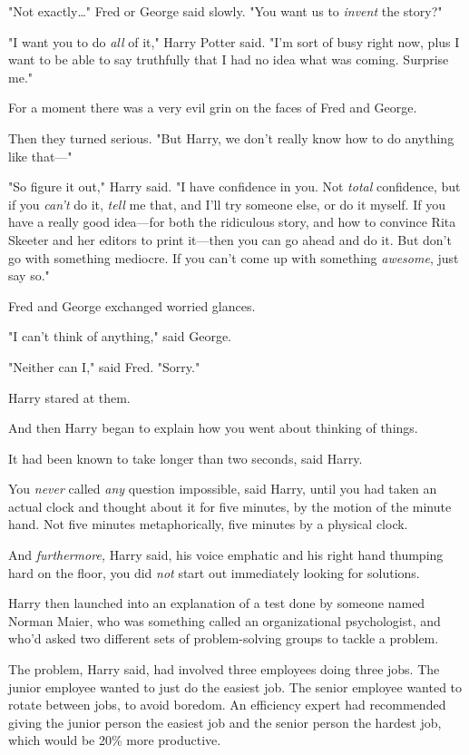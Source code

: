 "Not exactly{\ldots}" Fred or George said slowly. "You want us to \emph{invent} 
the story?"

"I want you to do \emph{all} of it," Harry Potter said. "I'm sort of busy right 
now, plus I want to be able to say truthfully that I had no idea what was 
coming. Surprise me."

For a moment there was a very evil grin on the faces of Fred and George.

Then they turned serious. "But Harry, we don't really know how to do anything 
like that---"

"So figure it out," Harry said. "I have confidence in you. Not \emph{total} 
confidence, but if you \emph{can't} do it, \emph{tell} me that, and I'll try 
someone else, or do it myself. If you have a really good idea---for both the 
ridiculous story, and how to convince Rita Skeeter and her editors to print 
it---then you can go ahead and do it. But don't go with something mediocre. If 
you can't come up with something \emph{awesome}, just say so."

Fred and George exchanged worried glances.

"I can't think of anything," said George.

"Neither can I," said Fred. "Sorry."

Harry stared at them.

And then Harry began to explain how you went about thinking of things.

It had been known to take longer than two seconds, said Harry.

You \emph{never} called \emph{any} question impossible, said Harry, until you 
had taken an actual clock and thought about it for five minutes, by the motion 
of the minute hand. Not five minutes metaphorically, five minutes by a physical 
clock.

And \emph{furthermore,} Harry said, his voice emphatic and his right hand 
thumping hard on the floor, you did \emph{not} start out immediately looking 
for solutions.

Harry then launched into an explanation of a test done by someone named Norman 
Maier, who was something called an organizational psychologist, and who'd asked 
two different sets of problem-solving groups to tackle a problem.

The problem, Harry said, had involved three employees doing three jobs. The 
junior employee wanted to just do the easiest job. The senior employee wanted 
to rotate between jobs, to avoid boredom. An efficiency expert had recommended 
giving the junior person the easiest job and the senior person the hardest job, 
which would be 20\% more productive.

